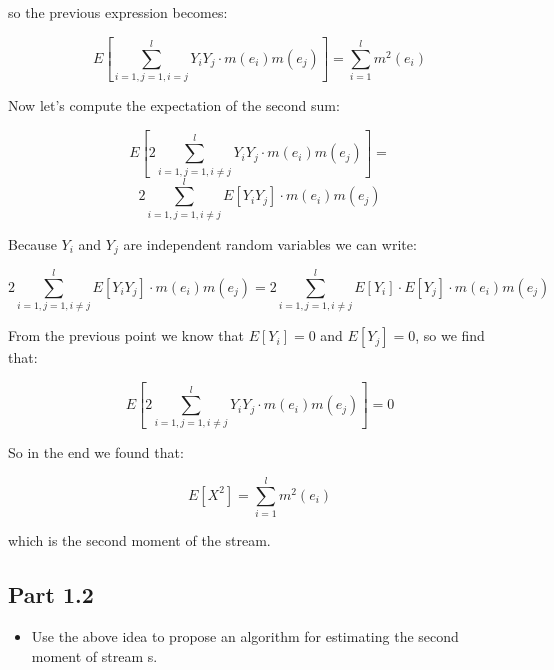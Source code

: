 \documentclass{article}
\begin{document}
so the previous expression becomes:

$$
E \left[ \sum_{i=1, j=1, i=j}^l Y_i Y_j \cdot m(e_i) m(e_j) \right] =
\sum_{i=1}^l m^2(e_i)
$$

Now let's compute the expectation of the second sum:

$$
E\left[ 2\sum_{i=1, j=1, i \neq j}^l Y_i Y_j \cdot m(e_i) m(e_j) \right] = 
$$
$$
2\sum_{i=1, j=1, i \neq j}^l E[Y_i Y_j] \cdot m(e_i) m(e_j) 
$$

Because $Y_i$ and $Y_j$ are independent random variables we can write:

$$
2\sum_{i=1, j=1, i \neq j}^l E[Y_i Y_j] \cdot m(e_i) m(e_j) = 
2\sum_{i=1, j=1, i \neq j}^l E[Y_i] \cdot E[Y_j] \cdot m(e_i) m(e_j) 
$$

From the previous point we know that $E[Y_i] = 0$ and $E[Y_j] = 0$, so  we find that:

$$
E\left[ 2\sum_{i=1, j=1, i \neq j}^l Y_i Y_j \cdot m(e_i) m(e_j) \right] = 0
$$


So in the end we found that:

$$
E[X^2] = \sum_{i=1}^l m^2(e_i)
$$


which is the second moment of the stream.






\subsection{Part 1.2}

\begin{itemize}
    \item Use the above idea to propose an algorithm for estimating the second moment of stream s.
\end{itemize}
\end{document}
